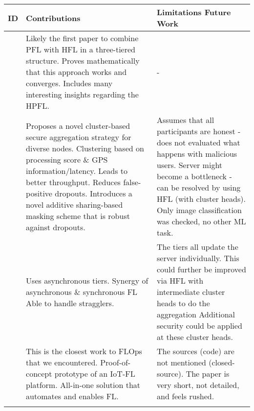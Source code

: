 \begin{changemargin}{-2cm}{0cm} 
    \begin{tabular}{|c||m{0.45\paperwidth}|m{0.35\paperwidth}|}
            \hline
            ID & Contributions & Limitations Future Work \\
        \hline
            \cite{HPFL_over_massive_mobile_edge_computing_networks}
            & 
            Likely the first paper to combine PFL with HFL in a three-tiered structure.
            Proves mathematically that this approach works and converges.
            Includes many interesting insights regarding the HPFL.
            &
            -
        \\
        \hline
            \cite{paper:cluster_based_secure_aggregation_for_fl}
            &
            Proposes a novel cluster-based secure aggregation strategy for diverse nodes.
            Clustering based on processing score \& GPS information/latency.
            Leads to better throughput.
            Reduces false-positive dropouts.
            Introduces a novel additive sharing-based masking scheme that is robust against dropouts.
            &
            Assumes that all participants are honest - does not evaluated what happens with malicious users.
            Server might become a bottleneck - can be resolved by using HFL (with cluster heads).
            Only image classification was checked, no other ML task.
        \\
        \hline
            \cite{paper:fedat_high_performance_communication_efficient_fl_with_asynch_tiers}
            &
            Uses asynchronous tiers.
            Synergy of asynchronous \& synchronous FL
            Able to handle stragglers.
            &
            The tiers all update the server individually.
            This could further be improved via HFL with intermediate cluster heads to do the aggregation
            Additional security could be applied at these cluster heads.
        \\
        \hline
            \cite{paper:global_fl_platform_for_iot}
            &
            This is the closest work to FLOps that we encountered.
            Proof-of-concept prototype of an IoT-FL platform.
            All-in-one solution that automates and enables FL.
            &
            The sources (code) are not mentioned (closed-source).
            The paper is very short, not detailed, and feels rushed.
        \\
        \hline
            \cite{paper:fl_toward_on_demand_client_deployment_at_edge}

\end{tabular}
\end{changemargin}
